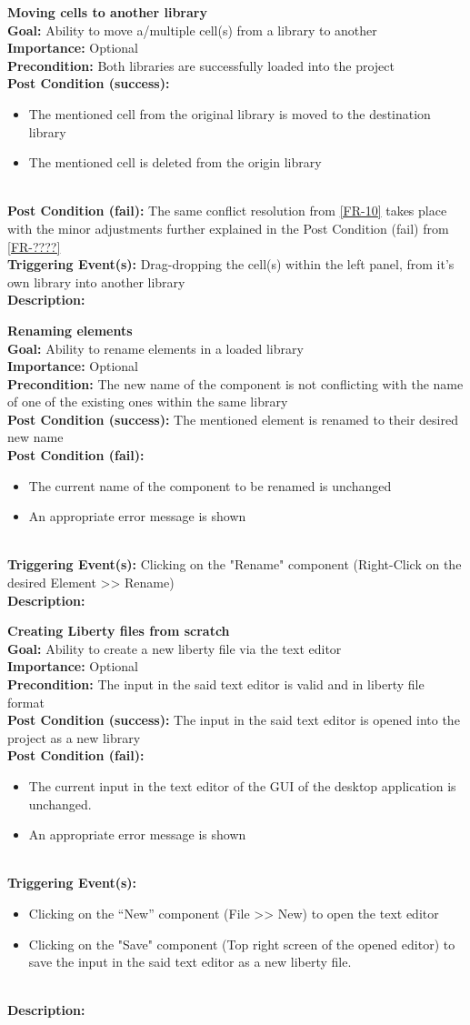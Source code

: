 \documentclass[10pt,a4paper]{report}
\newcommand{\precondition}[1]{
    \textbf{Precondition: } #1 \leavevmode \\
}
\newcommand{\FRDescription}[8]{
    \textbf{#1} \leavevmode \\
    \textbf{Goal: } #2 \leavevmode \\
    \textbf{Importance: } #3 \leavevmode \\
    \precondition{#4}
    \textbf{Post Condition (success): } #5 \leavevmode \\
    \textbf{Post Condition (fail): } #6 \leavevmode \\
    \textbf{Triggering Event(s): } #7 \leavevmode \\
    \textbf{Description: } \leavevmode \\ 
    #8}
\newcommand{\FRODescription}[8]{
    \textbf{#1} \leavevmode \\
    \textbf{Goal: } #2 \leavevmode \\
    \textbf{Importance: } #3 \leavevmode \\
    \precondition{#4}
    \textbf{Post Condition (success): } #5 \leavevmode \\
    \textbf{Post Condition (fail): } #6 \leavevmode \\
    \textbf{Triggering Event(s): } #7 \leavevmode \\
    \textbf{Description: } \leavevmode \\
    #8}
\begin{document}
\begin{FRO}
    \item \FRDescription{Moving cells to another library}
    {Ability to move a/multiple cell(s) from a library to another}
    {Optional}
    {Both libraries are successfully loaded into the project}
    {\begin{itemize}
        \item The mentioned cell from the original library is moved to the destination library
        \item The mentioned cell is deleted from the origin library
    \end{itemize}}
    {The same conflict resolution from \ref{FR-10} takes place with the minor adjustments further explained in the Post Condition (fail) from \ref{FR-????}}
    {Drag-dropping the cell(s) within the left panel, from it's own library into another library}
    \item \FRODescription{Renaming elements}
    {Ability to rename elements in a loaded library}
    {Optional}
    {The new name of the component is not conflicting with the name of one of the existing ones within the same library}
    {The mentioned element is renamed to their desired new name}
    {\begin{itemize}
        \item The current name of the component to be renamed is unchanged
        \item An appropriate error message is shown
    \end{itemize}}
    {Clicking on the "Rename" component (Right-Click on the desired Element  >> Rename)}
    \item \FRODescription{Creating Liberty files from scratch}
    {Ability to create a new liberty file via the text editor}
    {Optional}
    {The input in the said text editor is valid and in liberty file format}
    {The input in the said text editor is opened into the project as a new library}
    {\begin{itemize}
        \item The current input in the text editor of the GUI of the desktop application is unchanged.
        \item An appropriate error message is shown
    \end{itemize}}
    {\begin{itemize}
        \item Clicking on the “New” component (File >> New) to open the text editor
        \item Clicking on the "Save" component (Top right screen of the opened editor) to save the input in the said text editor as a new liberty file.

\end{itemize}}
\end{FRO}
\end{document}
